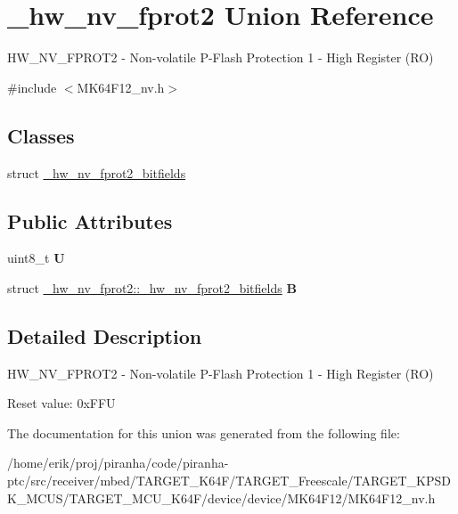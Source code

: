 \hypertarget{union__hw__nv__fprot2}{}\section{\+\_\+hw\+\_\+nv\+\_\+fprot2 Union Reference}
\label{union__hw__nv__fprot2}


H\+W\+\_\+\+N\+V\+\_\+\+F\+P\+R\+O\+T2 -\/ Non-\/volatile P-\/\+Flash Protection 1 -\/ High Register (RO)  




{\ttfamily \#include $<$M\+K64\+F12\+\_\+nv.\+h$>$}

\subsection*{Classes}
\begin{DoxyCompactItemize}
\item 
struct \hyperlink{struct__hw__nv__fprot2_1_1__hw__nv__fprot2__bitfields}{\+\_\+hw\+\_\+nv\+\_\+fprot2\+\_\+bitfields}
\end{DoxyCompactItemize}
\subsection*{Public Attributes}
\begin{DoxyCompactItemize}
\item 
uint8\+\_\+t {\bfseries U}\hypertarget{union__hw__nv__fprot2_ad12e2f7e31ff543cfbe6b443c4d9c9f5}{}\label{union__hw__nv__fprot2_ad12e2f7e31ff543cfbe6b443c4d9c9f5}

\item 
struct \hyperlink{struct__hw__nv__fprot2_1_1__hw__nv__fprot2__bitfields}{\+\_\+hw\+\_\+nv\+\_\+fprot2\+::\+\_\+hw\+\_\+nv\+\_\+fprot2\+\_\+bitfields} {\bfseries B}\hypertarget{union__hw__nv__fprot2_a6f8875d13ca1d95c3b6769462ee07a59}{}\label{union__hw__nv__fprot2_a6f8875d13ca1d95c3b6769462ee07a59}

\end{DoxyCompactItemize}


\subsection{Detailed Description}
H\+W\+\_\+\+N\+V\+\_\+\+F\+P\+R\+O\+T2 -\/ Non-\/volatile P-\/\+Flash Protection 1 -\/ High Register (RO) 

Reset value\+: 0x\+F\+FU 

The documentation for this union was generated from the following file\+:\begin{DoxyCompactItemize}
\item 
/home/erik/proj/piranha/code/piranha-\/ptc/src/receiver/mbed/\+T\+A\+R\+G\+E\+T\+\_\+\+K64\+F/\+T\+A\+R\+G\+E\+T\+\_\+\+Freescale/\+T\+A\+R\+G\+E\+T\+\_\+\+K\+P\+S\+D\+K\+\_\+\+M\+C\+U\+S/\+T\+A\+R\+G\+E\+T\+\_\+\+M\+C\+U\+\_\+\+K64\+F/device/device/\+M\+K64\+F12/M\+K64\+F12\+\_\+nv.\+h\end{DoxyCompactItemize}
